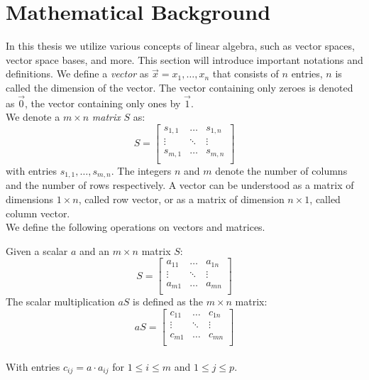 \section{Mathematical Background}
In this thesis we utilize various concepts of linear algebra, such as vector spaces, vector space bases, and more. This section will introduce important notations and definitions.
We define a \textsl{vector} as $\vec{x} = x_1, \ldots, x_n$ that consists of $n$ entries, $n$ is called the dimension of the vector. The vector containing only zeroes is denoted as $\vec{0}$, the vector containing only ones by $\vec{1}$. \\ We denote a $m \times n$ \textsl{matrix} $S$ as:
\begin{equation*}
	S = \begin{bmatrix}
		s_{1 ,1} & \ldots & s_{1, n} \\
		\vdots & \ddots & \vdots \\
		s_{m ,1} & \ldots & s_{m, n} \\
	\end{bmatrix}
\end{equation*}
with entries $s_{1, 1}, \ldots, s_{m, n}$. The integers $n$ and $m$ denote the number of columns and the number of rows respectively. A vector can be understood as a matrix of dimensions $1 \times n$, called row vector, or as a matrix of dimension $n \times 1$, called column vector. \\
We define the following operations on vectors and matrices.
\begin{mydef}
	Given a scalar $a$ and an $m \times n$ matrix $S$:
	\begin{equation*}
		S = 
		\begin{bmatrix}
			a_{11} & \ldots & a_{1n} \\
			\vdots & \ddots & \vdots \\
			a_{m1} & \ldots & a_{mn} \\
		\end{bmatrix}
		\end{equation*} The scalar multiplication $aS$ is defined as the $m \times n$ matrix:
		\begin{equation*}
		aS =
		\begin{bmatrix}
			c_{11} & \ldots & c_{1n} \\
			\vdots & \ddots & \vdots \\
			c_{m1} & \ldots & c_{mn} \\
		\end{bmatrix}
	\end{equation*} 
\\
	With entries $c_{ij} =  a \cdot a_{ij}$ for $1 \leq i \leq m$ and $1 \leq j \leq p$.
\end{mydef}
